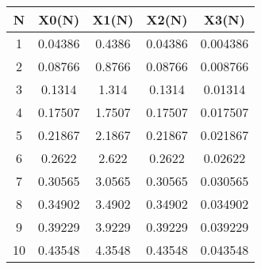 \begin{tabular}{|c|c|c|c|c|}
\hline
\textbf{N}&\textbf{X0(N)}&\textbf{X1(N)}&\textbf{X2(N)}&\textbf{X3(N)}\\\hline
1&0.04386&0.4386&0.04386&0.004386\\\hline
2&0.08766&0.8766&0.08766&0.008766\\\hline
3&0.1314&1.314&0.1314&0.01314\\\hline
4&0.17507&1.7507&0.17507&0.017507\\\hline
5&0.21867&2.1867&0.21867&0.021867\\\hline
6&0.2622&2.622&0.2622&0.02622\\\hline
7&0.30565&3.0565&0.30565&0.030565\\\hline
8&0.34902&3.4902&0.34902&0.034902\\\hline
9&0.39229&3.9229&0.39229&0.039229\\\hline
10&0.43548&4.3548&0.43548&0.043548\\\hline
\end{tabular}

